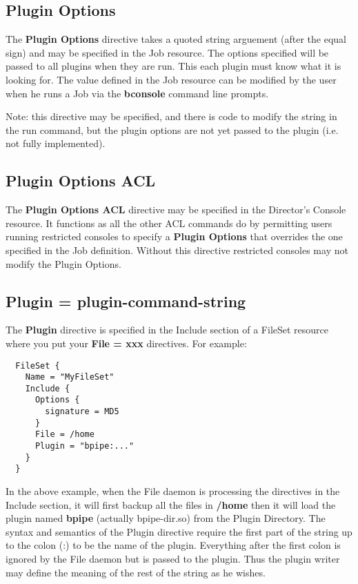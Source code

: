 \subsection{Plugin Options}
The {\bf Plugin Options} directive takes a quoted string
arguement (after the equal sign) and may be specified in the
Job resource.  The options specified will be passed to all plugins
when they are run.  This each plugin must know what it is looking
for. The value defined in the Job resource can be modified
by the user when he runs a Job via the {\bf bconsole} command line 
prompts.

Note: this directive may be specified, and there is code to modify
the string in the run command, but the plugin options are not yet passed to
the plugin (i.e. not fully implemented).

\subsection{Plugin Options ACL}
The {\bf Plugin Options ACL} directive may be specified in the
Director's Console resource. It functions as all the other ACL commands
do by permitting users running restricted consoles to specify a 
{\bf Plugin Options} that overrides the one specified in the Job
definition. Without this directive restricted consoles may not modify
the Plugin Options.

\subsection{Plugin = \lt{}plugin-command-string\gt{}}
The {\bf Plugin} directive is specified in the Include section of
a FileSet resource where you put your {\bf File = xxx} directives.
For example:

\begin{verbatim}
  FileSet {
    Name = "MyFileSet"
    Include {
      Options {
        signature = MD5
      }
      File = /home
      Plugin = "bpipe:..."
    }
  }
\end{verbatim}

In the above example, when the File daemon is processing the directives
in the Include section, it will first backup all the files in {\bf /home}
then it will load the plugin named {\bf bpipe} (actually bpipe-dir.so) from
the Plugin Directory.  The syntax and semantics of the Plugin directive
require the first part of the string up to the colon (:) to be the name
of the plugin. Everything after the first colon is ignored by the File daemon but
is passed to the plugin. Thus the plugin writer may define the meaning of the
rest of the string as he wishes.

